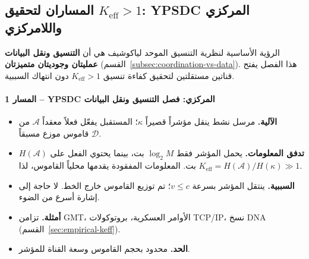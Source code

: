 \documentclass[11pt,a4paper]{article}
\begin{document}
	\subsection{المساران لتحقيق $K_{\mathrm{eff}} > 1$: YPSDC المركزي واللامركزي}
	\label{subsec:two-paths}
	
	الرؤية الأساسية لنظرية التنسيق الموحد لياكوشيف هي أن \textbf{التنسيق ونقل البيانات عمليتان وجوديتان متميزتان} (القسم~\ref{subsec:coordination-vs-data}). هذا الفصل يفتح قناتين مستقلتين لتحقيق كفاءة تنسيق $K_{\mathrm{eff}} > 1$ دون انتهاك السببية.
	
	\paragraph*{المسار 1 – YPSDC المركزي: فصل التنسيق ونقل البيانات}
	\begin{itemize}[leftmargin=*]
		\item \textbf{الآلية.} مرسل نشط ينقل مؤشراً قصيراً $\kappa$؛ المستقبل يفعّل فعلاً معقداً $\mathcal{A}$ من قاموس موزع مسبقاً $\mathcal{D}$.
		\item \textbf{تدفق المعلومات.} يحمل المؤشر فقط $\log_2 M$ بت، بينما يحتوي الفعل على $H(\mathcal{A})$ بت. المعلومات المفقودة يقدمها محلياً القاموس، لذا $K_{\mathrm{eff}} = H(\mathcal{A}) / H(\kappa) \gg 1$.
		\item \textbf{السببية.} ينتقل المؤشر بسرعة $v \le c$؛ تم توزيع القاموس خارج الخط. لا حاجة إلى إشارة أسرع من الضوء.
		\item \textbf{أمثلة.} تزامن GMT، الأوامر العسكرية، بروتوكولات TCP/IP، نسخ DNA (القسم~\ref{sec:empirical-keff}).
		\item \textbf{الحد.} محدود بحجم القاموس وسعة القناة للمؤشر.
	\end{itemize}
	
\end{document}
